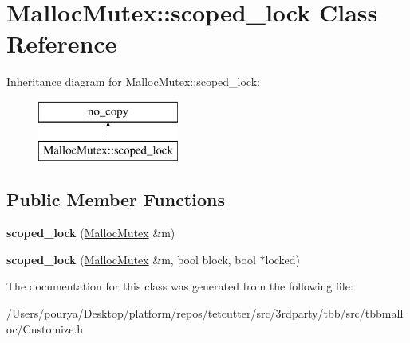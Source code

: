 \hypertarget{classMallocMutex_1_1scoped__lock}{}\section{Malloc\+Mutex\+:\+:scoped\+\_\+lock Class Reference}
\label{classMallocMutex_1_1scoped__lock}
Inheritance diagram for Malloc\+Mutex\+:\+:scoped\+\_\+lock\+:\begin{figure}[H]
\begin{center}
\leavevmode
\includegraphics[height=2.000000cm]{classMallocMutex_1_1scoped__lock}
\end{center}
\end{figure}
\subsection*{Public Member Functions}
\begin{DoxyCompactItemize}
\item 
\hypertarget{classMallocMutex_1_1scoped__lock_ac6f3b0002453ae74573a0570acee5177}{}{\bfseries scoped\+\_\+lock} (\hyperlink{classMallocMutex}{Malloc\+Mutex} \&m)\label{classMallocMutex_1_1scoped__lock_ac6f3b0002453ae74573a0570acee5177}

\item 
\hypertarget{classMallocMutex_1_1scoped__lock_a9065412643a062e67cb74a62673e13de}{}{\bfseries scoped\+\_\+lock} (\hyperlink{classMallocMutex}{Malloc\+Mutex} \&m, bool block, bool $\ast$locked)\label{classMallocMutex_1_1scoped__lock_a9065412643a062e67cb74a62673e13de}

\end{DoxyCompactItemize}


The documentation for this class was generated from the following file\+:\begin{DoxyCompactItemize}
\item 
/\+Users/pourya/\+Desktop/platform/repos/tetcutter/src/3rdparty/tbb/src/tbbmalloc/Customize.\+h\end{DoxyCompactItemize}
